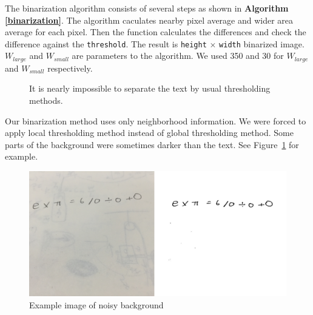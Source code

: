\documentclass[10pt,twocolumn,letterpaper]{article}
\begin{document}
The binarization algorithm consists of several steps as shown in \textbf{Algorithm \ref{binarization}}.
The algorithm caculates nearby pixel average and wider area average for each pixel.
Then the function calculates the differences and check the difference against the \texttt{threshold}.
The result is \texttt{height} $\times$ \texttt{width} binarized image.
$W_{large}$ and $W_{small}$ are parameters to the algorithm.
We used 350 and 30 for $W_{large}$ and $W_{small}$ respectively.

\begin{figure}[t]
\begin{center}
\end{center}
   \caption{It is nearly impossible to separate the text by usual thresholding methods. }
\label{fig:thresholding}
\end{figure}

Our binarization method uses only neighborhood information.
We were forced to apply local thresholding method instead of global thresholding method.
Some parts of the background were sometimes darker than the text.
See Figure~\ref{fig:thresholding} for example.

\begin{figure}[h]
\begin{center}
   \includegraphics[width=0.97\linewidth]{img/noisybg.png}
\end{center}
\caption{Example image of noisy background}
\label{fig:noisy}
\end{figure}
\end{document}
